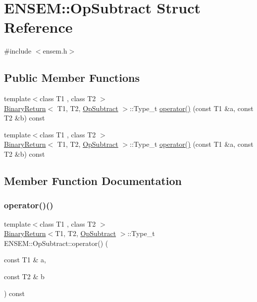 \hypertarget{structENSEM_1_1OpSubtract}{}\section{E\+N\+S\+EM\+:\+:Op\+Subtract Struct Reference}
\label{structENSEM_1_1OpSubtract}


{\ttfamily \#include $<$ensem.\+h$>$}

\subsection*{Public Member Functions}
\begin{DoxyCompactItemize}
\item 
{\footnotesize template$<$class T1 , class T2 $>$ }\\\mbox{\hyperlink{structENSEM_1_1BinaryReturn}{Binary\+Return}}$<$ T1, T2, \mbox{\hyperlink{structENSEM_1_1OpSubtract}{Op\+Subtract}} $>$\+::Type\+\_\+t \mbox{\hyperlink{structENSEM_1_1OpSubtract_ac246484950e9df9cb101370fd5f7f6b0}{operator()}} (const T1 \&a, const T2 \&b) const
\item 
{\footnotesize template$<$class T1 , class T2 $>$ }\\\mbox{\hyperlink{structENSEM_1_1BinaryReturn}{Binary\+Return}}$<$ T1, T2, \mbox{\hyperlink{structENSEM_1_1OpSubtract}{Op\+Subtract}} $>$\+::Type\+\_\+t \mbox{\hyperlink{structENSEM_1_1OpSubtract_ac246484950e9df9cb101370fd5f7f6b0}{operator()}} (const T1 \&a, const T2 \&b) const
\end{DoxyCompactItemize}


\subsection{Member Function Documentation}
\mbox{\label{structENSEM_1_1OpSubtract_ac246484950e9df9cb101370fd5f7f6b0}} 
\subsubsection{\texorpdfstring{operator()()}{operator()()}\hspace{0.1cm}{\footnotesize\ttfamily [1/2]}}
{\footnotesize\ttfamily template$<$class T1 , class T2 $>$ \\
\mbox{\hyperlink{structENSEM_1_1BinaryReturn}{Binary\+Return}}$<$T1, T2, \mbox{\hyperlink{structENSEM_1_1OpSubtract}{Op\+Subtract}} $>$\+::Type\+\_\+t E\+N\+S\+E\+M\+::\+Op\+Subtract\+::operator() (\begin{DoxyParamCaption}\item[{const T1 \&}]{a,  }\item[{const T2 \&}]{b }\end{DoxyParamCaption}) const\hspace{0.3cm}{\ttfamily [inline]}}

